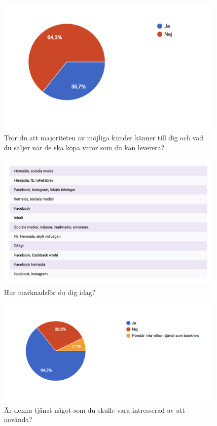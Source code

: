 \documentclass[10pt,a4paper,oneside]{article}
\begin{document}
\begin{figure}
	\includegraphics[scale=0.6]{7.png}
	\caption{Tror du att majoriteten av m\"ojliga kunder k\"anner till dig och vad du s\"aljer när de ska k\"opa varor som du kan leverera?}
\end{figure}

\begin{figure}
	\includegraphics[scale=0.6]{8.png}
	\caption{Hur marknadsf\"or du dig idag?}
\end{figure}

\begin{figure}
	\includegraphics[scale=0.6]{9.png}
	\caption{\"Ar denna tj\"anst n\r{a}got som du skulle vara intresserad av att anv\"anda?}
\end{figure}
\end{document}
